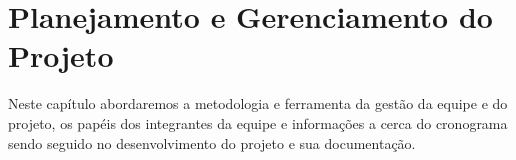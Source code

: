 \chapter{Planejamento e Gerenciamento do Projeto}
Neste capítulo abordaremos a metodologia e ferramenta da gestão da equipe e do projeto, os papéis dos integrantes da equipe e informações a cerca do cronograma sendo seguido no desenvolvimento do projeto e sua documentação.




